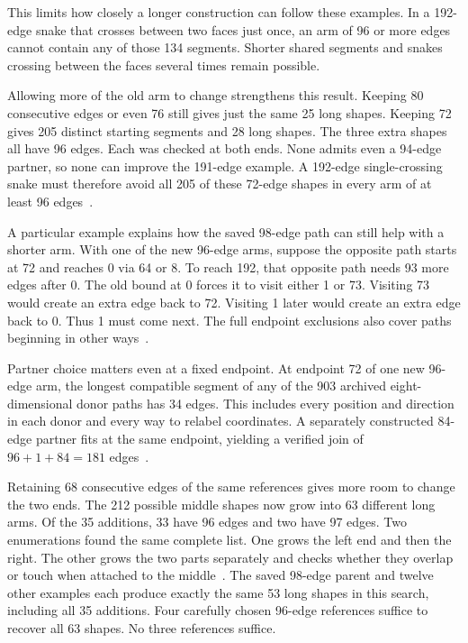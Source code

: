 \documentclass[11pt,a4paper]{article}
\begin{document}
This limits how closely a longer construction can follow these examples.
In a 192-edge snake that crosses between two faces just once, an arm
of 96 or more edges cannot contain any of those 134 segments. Shorter
shared segments and snakes crossing between the faces several times
remain possible.

Allowing more of the old arm to change strengthens this result.
Keeping 80 consecutive edges or even 76 still gives just the same
25 long shapes. Keeping 72 gives 205 distinct starting segments and
28 long shapes. The three extra shapes all have 96 edges. Each was
checked at both ends. None admits even a 94-edge partner, so none
can improve the 191-edge example. A 192-edge single-crossing snake
must therefore avoid all 205 of these 72-edge shapes in every arm
of at least 96 edges~\cite{segment251}.

A particular example explains how the saved 98-edge path can still
help with a shorter arm. With one of the new 96-edge arms, suppose
the opposite path starts at 72 and reaches 0 via 64 or 8. To reach
192, that opposite path needs 93 more edges after 0. The old bound
at 0 forces it to visit either 1 or 73. Visiting 73 would create an
extra edge back to 72. Visiting 1 later would create an extra edge
back to 0. Thus 1 must come next. The full endpoint exclusions also
cover paths beginning in other ways~\cite{segment251}.

Partner choice matters even at a fixed endpoint. At endpoint 72 of one
new 96-edge arm, the longest compatible segment of any of the 903
archived eight-dimensional donor paths has 34 edges. This includes
every position and direction in each donor and every way to relabel
coordinates. A separately constructed 84-edge partner fits at the
same endpoint, yielding a verified join of $96+1+84=181$
edges~\cite{segment251}.

Retaining 68 consecutive edges of the same references gives more
room to change the two ends. The 212 possible middle shapes now
grow into 63 different long arms. Of the 35 additions, 33 have
96 edges and two have 97 edges. Two enumerations found the same
complete list. One grows the left end and then the right. The
other grows the two parts separately and checks whether they
overlap or touch when attached to the middle~\cite{short252}.
The saved 98-edge parent and twelve other examples each produce
exactly the same 53 long shapes in this search, including all 35
additions. Four carefully chosen 96-edge references suffice to
recover all 63 shapes. No three references suffice.
\end{document}

